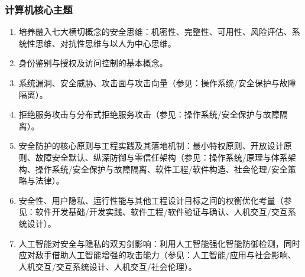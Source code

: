 \subsubsection{计算机核心主题}
\begin{enumerate}\setlength{\itemsep}{0pt}\setlength{\parskip}{0pt}
    \item 培养融入七大横切概念的安全思维：机密性、完整性、可用性、风险评估、系统性思维、对抗性思维与以人为中心思维。
    \item 身份鉴别与授权及访问控制的基本概念。
    \item 系统漏洞、安全威胁、攻击面与攻击向量（参见：操作系统/安全保护与故障隔离）。
    \item 拒绝服务攻击与分布式拒绝服务攻击（参见：操作系统/安全保护与故障隔离）。
    \item 安全防护的核心原则与工程实践及其落地机制：最小特权原则、开放设计原则、故障安全默认、纵深防御与零信任架构（参见：操作系统/原理与体系架构、操作系统/安全保护与故障隔离、软件工程/软件构造、社会伦理/安全策略与法律）。
    \item 安全性、用户隐私、运行性能与其他工程设计目标之间的权衡优化考量（参见：软件开发基础/开发实践、软件工程/软件验证与确认、人机交互/交互系统设计）。
    \item 人工智能对安全与隐私的双刃剑影响：利用人工智能强化智能防御检测，同时应对敌手借助人工智能增强的攻击能力（参见：人工智能/应用与社会影响、人机交互/交互系统设计、人机交互/社会伦理）。
\end{enumerate}

